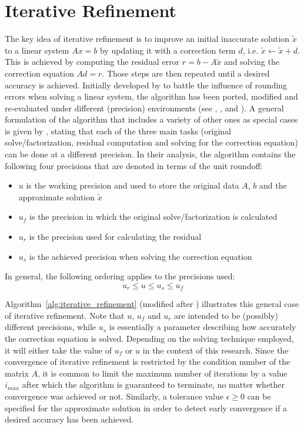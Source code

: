 \section{Iterative Refinement}
\label{sec:iterative_refinement2}

The key idea of iterative refinement is to improve an initial inaccurate solution $\tilde{x}$ to a linear system $Ax=b$ by updating it with a correction term $d$, i.e. $\tilde{x}\leftarrow \tilde{x} + d$. This is achieved by computing the residual error $r=b-A\tilde{x}$ and solving the correction equation $Ad=r$. Those steps are then repeated until a desired accuracy is achieved. Initially developed by \cite{wilkinson_rounding_1963} to battle the influence of rounding errors when solving a linear system, the algorithm has been ported, modified and  re-evaluated under different (precision) environments (see \cite{moler_iterative_1967}, \cite{skeel_iterative_1980}, \cite{buttari_mixed_2007} and \cite{carson_accelerating_2018}). A general formulation of the algorithm that includes a variety of other ones as special cases is given by \cite{carson_accelerating_2018}, stating that each of the three main tasks (original solve/factorization, residual computation and solving for the correction equation) can be done at a different precision. In  their analysis, the algorithm contains the following four precisions that are denoted in terms of the unit roundoff:
\begin{itemize}
    \item $u$ is the working precision and used to store the original data $A$, $b$ and the approximate solution $\tilde{x}$
    \item $u_f$ is the precision in which the original solve/factorization is calculated
    \item $u_r$ is the precision used for calculating the residual
    \item $u_s$ is the achieved precision when solving the correction equation
\end{itemize}
In general, the following ordering applies to the precisions used:
\begin{equation}
    u_r \leq u \leq u_s \leq u_f
\end{equation}

\noindent Algorithm~\hyperref[alg:iterative_refinement]{\ref{alg:iterative_refinement}} (modified after \cite{carson_new_2017}) illustrates this general case of iterative refinement. Note that $u$, $u_f$ and $u_r$ are intended to be (possibly) different precisions, while $u_s$ is essentially a parameter describing how accurately the correction equation is solved. Depending on the solving technique employed, it will either take the value of $u_f$ or $u$ in the context of this research. Since the convergence of iterative refinement is restricted by the condition number of the matrix $A$, it is common to limit the maximum number of iterations by a value $i_{max}$ after which the algorithm is guaranteed to terminate, no matter whether convergence was achieved or not. Similarly, a tolerance value $\epsilon \geq 0$ can be specified for the approximate solution in order to detect early convergence if a desired accuracy has been achieved.

